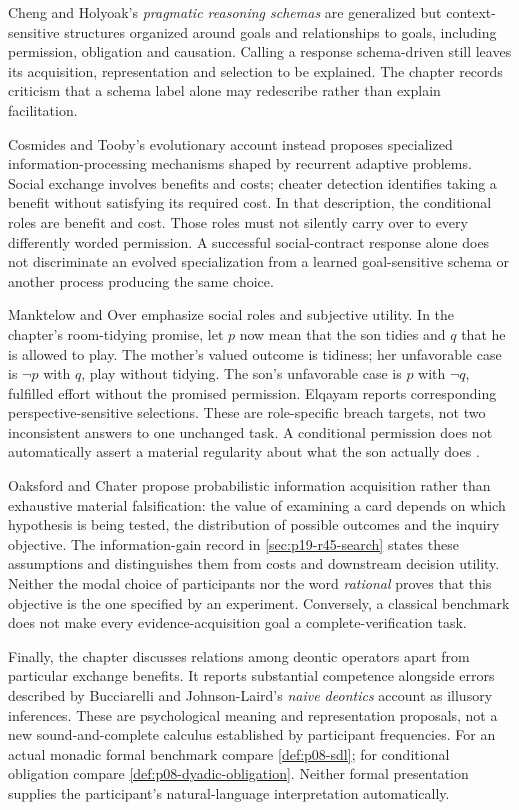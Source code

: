 Cheng and Holyoak's \emph{pragmatic reasoning schemas} are generalized but
context-sensitive structures organized around goals and relationships to
goals, including permission, obligation and causation. Calling a response
schema-driven still leaves its acquisition, representation and selection to
be explained. The chapter records criticism that a schema label alone may
redescribe rather than explain facilitation.

Cosmides and Tooby's evolutionary account instead proposes specialized
information-processing mechanisms shaped by recurrent adaptive problems.
Social exchange involves benefits and costs; cheater detection identifies
taking a benefit without satisfying its required cost. In that description,
the conditional roles are benefit and cost. Those roles must not silently
carry over to every differently worded permission. A successful social-contract
response alone does not discriminate an evolved specialization from a learned
goal-sensitive schema or another process producing the same choice.

Manktelow and Over emphasize social roles and subjective utility. In the
chapter's room-tidying promise, let \(p\) now mean that the son tidies and
\(q\) that he is allowed to play. The mother's valued outcome is tidiness;
her unfavorable case is \(\neg p\) with \(q\), play without tidying. The
son's unfavorable case is \(p\) with \(\neg q\), fulfilled effort without
the promised permission. Elqayam reports corresponding perspective-sensitive
selections. These are role-specific breach targets, not two inconsistent
answers to one unchanged task. A conditional permission does not automatically
assert a material regularity about what the son actually does
\cite[pp.~652--653]{Elqayam2021DeonticPsychology}.

Oaksford and Chater propose probabilistic information acquisition rather than
exhaustive material falsification: the value of examining a card depends on
which hypothesis is being tested, the distribution of possible outcomes and
the inquiry objective. The information-gain record in
\cref{sec:p19-r45-search} states these assumptions and distinguishes them
from costs and downstream decision utility. Neither the modal choice of
participants nor the word \emph{rational} proves that this objective is the
one specified by an experiment. Conversely, a classical benchmark does not
make every evidence-acquisition goal a complete-verification task.

Finally, the chapter discusses relations among deontic operators apart from
particular exchange benefits. It reports substantial competence alongside
errors described by Bucciarelli and Johnson-Laird's \emph{naive deontics}
account as illusory inferences. These are psychological meaning and
representation proposals, not a new sound-and-complete calculus established
by participant frequencies. For an actual monadic formal benchmark compare
\cref{def:p08-sdl}; for conditional obligation compare
\cref{def:p08-dyadic-obligation}. Neither formal presentation supplies the
participant's natural-language interpretation automatically.

